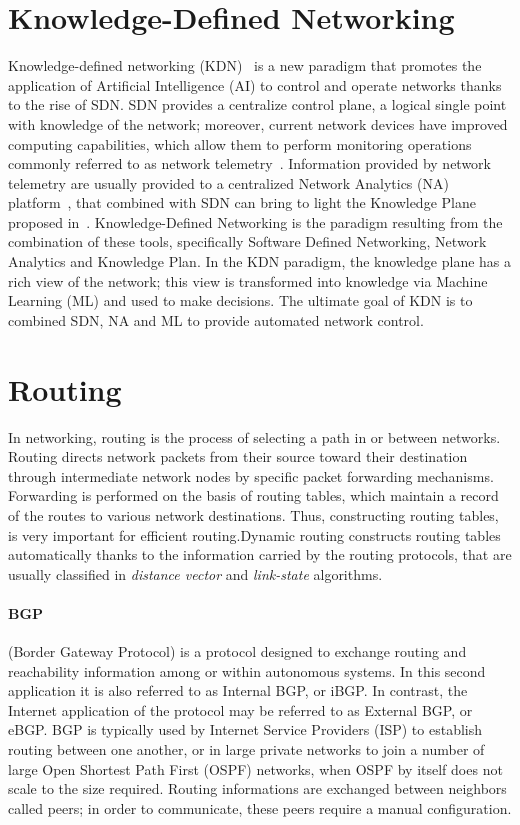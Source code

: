 \section{Knowledge-Defined Networking}
Knowledge-defined networking (KDN)~\cite{mestres2017knowledge} is a new paradigm that promotes the application of Artificial Intelligence (AI) to control and operate networks thanks to the rise of SDN. SDN provides a centralize control plane, a logical single point with knowledge of the network; moreover, current network devices have improved computing capabilities, which allow them to perform monitoring operations commonly referred to as network telemetry~\cite{kim2015band}. Information provided by network telemetry are usually provided to a centralized Network Analytics (NA) platform~\cite{clemm2015dna}, that combined with SDN can bring to light the Knowledge Plane proposed in~\cite{clark2003knowledge}. Knowledge-Defined Networking is the paradigm resulting from the combination of these tools, specifically Software Defined Networking, Network Analytics and Knowledge Plan. In the KDN paradigm, the knowledge plane has a rich view of the network; this view is transformed into knowledge via Machine Learning (ML) and used to make decisions. The ultimate goal of KDN is to combined SDN, NA and ML to provide automated network control.

\section{Routing}
In networking, routing is the process of selecting a path in or between networks. Routing directs network packets from their source toward their destination through intermediate network nodes by specific packet forwarding mechanisms. Forwarding is performed on the basis of routing tables, which maintain a record of the routes to various network destinations. Thus, constructing routing tables, is very important for efficient routing.Dynamic routing constructs routing tables automatically thanks to the information carried by the routing protocols, that are usually classified in \textit{distance vector} and \textit{link-state} algorithms.

\paragraph{BGP} (Border Gateway Protocol) is a protocol designed to exchange routing and reachability information among or within autonomous systems. In this second application it is also referred to as Internal BGP, or iBGP. In contrast, the Internet application of the protocol may be referred to as External BGP, or eBGP. BGP is typically used by Internet Service Providers (ISP) to establish routing between one another, or in large private networks to join a number of large Open Shortest Path First (OSPF) networks, when OSPF by itself does not scale to the size required. Routing informations are exchanged between neighbors called peers; in order to communicate, these peers require a manual configuration.

